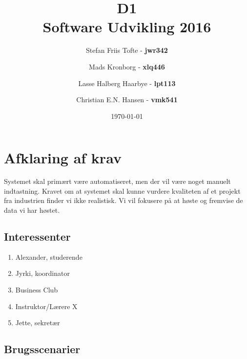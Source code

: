 \documentclass[11pt]{article}
\title{
  \vspace{3cm}
  \Huge{D1} \\
  \Large{Software Udvikling 2016}
}
\author{
	\Large{Stefan Friis Tofte} - \textbf{jwr342}%
	\and
	\Large{Mads Kronborg} - \textbf{xlq446}%
	\and
	\Large{Lasse Halberg Haarbye} - \textbf{lpt113}%
	\and
	\Large{Christian E.N. Hansen} - \textbf{vmk541}%
}
\date{
    \today
}
\def \ColourPDF {../include/ku-farve}
\def \TitlePDF {../include/ku-en}  %
\begin{document}


\clearpage\maketitle
\thispagestyle{empty}

\newpage
\tableofcontents
\newpage
\section{Afklaring af krav}
Systemet skal primært være automatiseret, men der vil være noget manuelt indtastning. Kravet om at systemet skal kunne vurdere kvaliteten af et projekt fra industrien finder vi ikke realistisk. Vi vil fokusere på at høste og fremvise de data vi har høstet.


\subsection{Interessenter}
\begin{enumerate}
\item Alexander, studerende
\item Jyrki, koordinator
\item Business Club
\item Instruktor/Lærere X
\item Jette, sekretær
\end{enumerate}
\subsection{Brugsscenarier}
\end{document}
